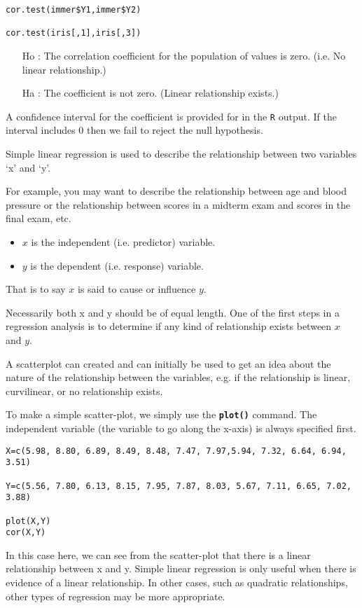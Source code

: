 \documentclass[a4paper,12pt]{article}
\begin{document}
\begin{framed}
\begin{verbatim}
cor.test(immer$Y1,immer$Y2)

cor.test(iris[,1],iris[,3])
\end{verbatim}
\end{framed}

\begin{itemize}
\item[Ho] : The correlation coefficient for the population of values is zero. (i.e. No linear relationship.)
\item[Ha]: The coefficient is not zero. (Linear relationship exists.)
\end{itemize}	


A confidence interval for the coefficient is provided for in the \texttt{R} output. If the interval includes 0 then we fail to reject the null hypothesis.

Simple linear regression is used to describe the relationship between two variables ‘x’ and ‘y’.

For example, you may want to describe the relationship between age and blood pressure or the relationship between scores in a midterm exam and scores in the final exam, etc.

\begin{itemize}
\item	$x$ is the independent (i.e. predictor) variable.
\item	$y$ is the dependent (i.e. response) variable.
\end{itemize}
That is to say $x$ is said to cause or influence $y$.

Necessarily both x and y should be of equal length. One of the first steps in a regression analysis is to determine if any kind of relationship exists between $x$ and $y$.

A scatterplot can created and can initially be used to get an idea about the nature of the relationship between the variables, e.g. if the relationship is linear, curvilinear, or no relationship exists.

To make a simple scatter-plot, we simply use the \texttt{\textbf{plot()}} command. The independent variable (the variable to go along the x-axis) is always specified first.



\begin{framed}
\begin{verbatim}
X=c(5.98, 8.80, 6.89, 8.49, 8.48, 7.47, 7.97,5.94, 7.32, 6.64, 6.94, 3.51)

Y=c(5.56, 7.80, 6.13, 8.15, 7.95, 7.87, 8.03, 5.67, 7.11, 6.65, 7.02, 3.88)

plot(X,Y)
cor(X,Y)
\end{verbatim}
\end{framed}
In this case here, we can see from the scatter-plot that there is a linear relationship between x and y.
Simple linear regression is only useful when there is evidence of a linear relationship. In other cases, such as quadratic relationships, other types of regression may be more appropriate.
\end{document}
